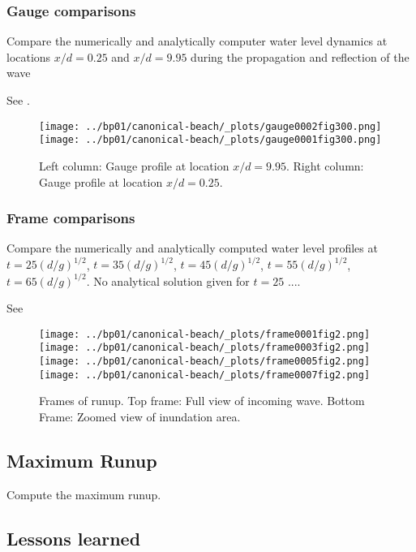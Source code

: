 \subsubsection{Gauge comparisons}
Compare the numerically and analytically computer water level dynamics at locations $x/d = 0.25$ and $x/d = 9.95$ during the propagation and reflection of the wave


See .

\begin{figure}[ht]
\hfil\texttt{[image: ../bp01/canonical-beach/\_plots/gauge0002fig300.png]}\hfil
\hfil\texttt{[image: ../bp01/canonical-beach/\_plots/gauge0001fig300.png]}\hfil
\caption{\label{fig:bp1gauges} 
Left column: Gauge profile at location $x/d = 9.95$.
Right column: Gauge profile at location $x/d = 0.25$.
 }
\end{figure}



\subsubsection{Frame comparisons}
Compare the numerically and analytically computed water level profiles at $t = 25(d/g)^{1/2}$, $t = 35(d/g)^{1/2}$, $t = 45(d/g)^{1/2}$, $t = 55(d/g)^{1/2}$, $t = 65(d/g)^{1/2}$.
No analytical solution given for $ t = 25$ ....

See 
\begin{figure}[ht]
\hfil\texttt{[image: ../bp01/canonical-beach/\_plots/frame0001fig2.png]}\hfil
\hfil\texttt{[image: ../bp01/canonical-beach/\_plots/frame0003fig2.png]}\hfil
\vskip 5pt
\hfil\texttt{[image: ../bp01/canonical-beach/\_plots/frame0005fig2.png]}\hfil
\hfil\texttt{[image: ../bp01/canonical-beach/\_plots/frame0007fig2.png]}\hfil
\caption{\label{fig:bp1frames} 
Frames of runup. Top frame: Full view of incoming wave. Bottom Frame: Zoomed view of inundation area.}
\end{figure}

\subsection{Maximum Runup}
Compute the maximum runup.

\subsection{Lessons learned}

